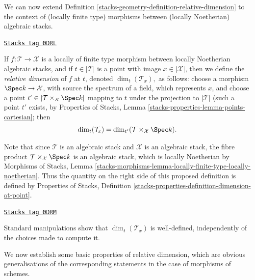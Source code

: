 We can now extend Definition \ref{stacks-geometry-definition-relative-dimension}
to the context of (locally finite type)
morphisms between (locally Noetherian) algebraic stacks.

\begin{definition}
\label{stacks-geometry-definition-relative-dimension-for-stacks}
\href{https://stacks.math.columbia.edu/tag/0DRL}{\texttt{Stacks tag 0DRL}}

If $f : \mathcal{T} \to \mathcal{X}$
is a locally of finite type morphism between
locally Noetherian algebraic stacks, and if
$t \in |\mathcal{T}|$ is a point with image $x \in |\mathcal{X}|$, then
we define the {\it relative dimension} of $f$ at $t$, denoted
$\dim_t(\mathcal{T}_x),$ as follows:
choose a morphism $\Spec k \to \mathcal{X}$, with source the spectrum of
a field, which represents $x$, and choose a point
$t' \in |\mathcal{T} \times_{\mathcal{X}} \Spec k|$
mapping to $t$ under the projection to $|\mathcal{T}|$
(such a point $t'$ exists, by
Properties of Stacks, Lemma
\ref{stacks-properties-lemma-points-cartesian}; then
$$
\dim_t(\mathcal{T}_x) = \dim_{t'}(\mathcal{T} \times_{\mathcal{X}} \Spec k ).
$$
\end{definition}

Note that since $\mathcal{T}$ is an algebraic stack and $\mathcal{X}$ is an
algebraic stack, the fibre product $\mathcal{T}\times_{\mathcal{X}} \Spec k$
is an algebraic stack, which is locally Noetherian by
Morphisms of Stacks, Lemma
\ref{stacks-morphisms-lemma-locally-finite-type-locally-noetherian}.
Thus the quantity on the right side of this proposed definition
is defined by Properties of Stacks,
Definition \ref{stacks-properties-definition-dimension-at-point}.

\begin{remark}
\label{stacks-geometry-remark-dimension-tangent-space-well-defined}
\href{https://stacks.math.columbia.edu/tag/0DRM}{\texttt{Stacks tag 0DRM}}

Standard manipulations show that $\dim_t(\mathcal{T}_x)$ is well-defined,
independently of the choices made to compute it.
\end{remark}

We now establish some basic properties of relative dimension, which
are obvious generalisations of the corresponding statements in the
case of morphisms of schemes.

